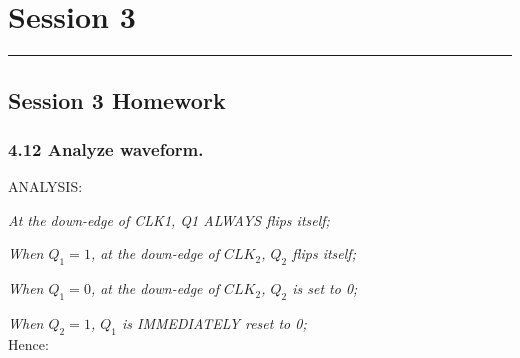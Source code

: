 \section{Session 3}
\vspace{-15pt}\noindent\rule{\textwidth}{0.1pt}\vspace{-10pt}
    \subsection*{Session 3 Homework}
    \subsubsection{4.12 \textnormal{Analyze waveform}.}
    {\color{hwSolution}
    \noindent ANALYSIS:

    \textit{At the down-edge of CLK1, Q1 ALWAYS flips itself;}

    \textit{When $Q_1 = 1$, at the down-edge of $CLK_2$, $Q_2$ flips itself;}

    \textit{When $Q_1 = 0$, at the down-edge of $CLK_2$, $Q_2$ is set to 0;}

    \textit{When $Q_2 = 1$, $Q_1$ is IMMEDIATELY reset to 0;}
    \\
    Hence:

}
